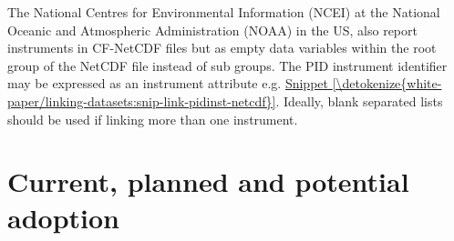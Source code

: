 \documentclass[a4paper,10pt,english]{sphinxmanual}
\begin{document}
The National Centres for Environmental Information (NCEI) at the
National Oceanic and Atmospheric Administration (NOAA) in the US, also
report instruments in CF-NetCDF files but as empty data variables within
the root group of the NetCDF file instead of sub groups. The PID
instrument identifier may be expressed as an instrument attribute e.g.
\hyperref[\detokenize{white-paper/linking-datasets:snip-link-pidinst-netcdf}]{Snippet \ref{\detokenize{white-paper/linking-datasets:snip-link-pidinst-netcdf}}}. Ideally, blank separated lists
should be used if linking more than one instrument.
\def\sphinxLiteralBlockLabel{\label{\detokenize{white-paper/linking-datasets:id10}}\label{\detokenize{white-paper/linking-datasets:snip-link-pidinst-netcdf}}}
\begin{sphinxVerbatim}[commandchars=\\\{\}]
   
        
        
        
\end{sphinxVerbatim}


\section{Current, planned and potential adoption}
\label{\detokenize{white-paper/adoption:current-planned-and-potential-adoption}}\label{\detokenize{white-paper/adoption::doc}}
\end{document}
